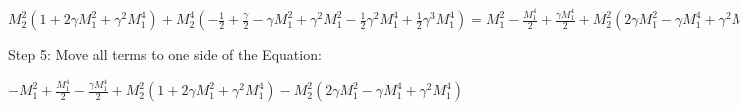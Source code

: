 \documentclass{article}
\begin{document}
$M_2^2 (1 + 2 \gamma M_1^2 + \gamma^2 M_1^4) + M_2^4 \left(-\frac{1}{2} + \frac{\gamma}{2} - \gamma M_1^2 + \gamma^2 M_1^2 - \frac{1}{2} \gamma^2 M_1^4 + \frac{1}{2} \gamma^3 M_1^4\right) = M_1^2 - \frac{M_1^4}{2} + \frac{\gamma M_1^4}{2} + M_2^2 (2 \gamma M_1^2 - \gamma M_1^4 + \gamma^2 M_1^4) + M_2^4 (\gamma^2 M_1^2 - \frac{1}{2} \gamma^2 M_1^4 + \frac{1}{2} \gamma^3 M_1^4)$



Step 5: Move all terms to one side of the Equation:


$-M_1^2 + \frac{M_1^4}{2} - \frac{\gamma M_1^4}{2} + M_2^2 (1 + 2 \gamma M_1^2 + \gamma^2 M_1^4) - M_2^2 (2 \gamma M_1^2 - \gamma M_1^4 + \gamma^2 M_1^4)$
\end{document}
